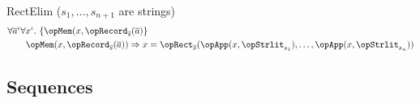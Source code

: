 \documentclass[11pt, a4paper, oneside]{article}
\begin{document}
\begin{axioms}
\item[RectElim (\rm$s_1,\dots,s_{n+1}$ are strings)] \[
        \begin{aligned}
            &\forall \overline{a}^\idv \forall x^\idv.\, \st{ \opMem(x, \opRecord_{\overline{s}}(\overline{a}) } \\
            &\qquad \opMem(x, \opRecord_{\overline{s}}(\overline{a})) \imp x = \opRect_{\overline{s}}(\opApp(x, \opStrlit_{s_1}), \dots, \opApp(x, \opStrlit_{s_n}))
        \end{aligned}
    \]

\end{axioms}


    \subsection{Sequences}
    \label{subsec:seqs}
\end{document}
